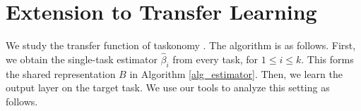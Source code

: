 \section{Extension to Transfer Learning}

We study the transfer function of taskonomy \cite{ZSSGM18}.
The algorithm is as follows.
First, we obtain the single-task estimator $\hat{\beta}_i$ from every task, for $1\le i \le k$.
This forms the shared representation $B$ in Algorithm \ref{alg_estimator}.
Then, we learn the output layer on the target task.
We use our tools to analyze this setting as follows.